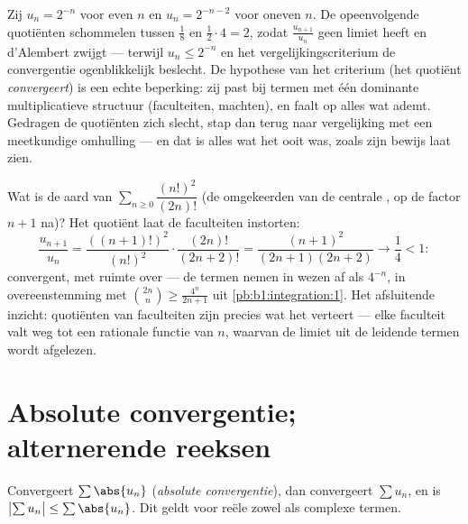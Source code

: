 \begin{example}\label{ex:b1:series:rationotnecessary}
Zij $u_n = 2^{-n}$ voor even $n$ en $u_n = 2^{-n-2}$ voor oneven
$n$. De opeenvolgende quotiënten schommelen tussen $\frac{1}{8}$
en $\frac12\cdot4 = 2$, zodat $\frac{u_{n+1}}{u_n}$ geen limiet
heeft en d'Alembert zwijgt --- terwijl $u_n \leq 2^{-n}$ en het
vergelijkingscriterium de convergentie ogenblikkelijk beslecht.
De hypothese van het criterium (het quotiënt \emph{convergeert})
is een echte beperking: zij past bij termen met één dominante
multiplicatieve structuur (faculteiten, machten), en faalt op
alles wat ademt. Gedragen de quotiënten zich slecht, stap dan
terug naar vergelijking met een meetkundige omhulling --- en dat
is alles wat het  ooit was, zoals zijn bewijs
laat zien.
\end{example}

\begin{example}\label{ex:b1:series:ratiobinom}
Wat is de aard van $\sum_{n\geq0} \dfrac{(n!)^2}{(2n)!}$ (de
omgekeerden van de centrale , op de factor
$n + 1$ na)? Het quotiënt laat de faculteiten instorten:
\[
\frac{u_{n+1}}{u_n}
= \frac{((n+1)!)^2}{(n!)^2}\cdot\frac{(2n)!}{(2n+2)!}
= \frac{(n+1)^2}{(2n+1)(2n+2)}
\longrightarrow \frac14 < 1 :
\]
convergent, met ruimte over --- de termen nemen in wezen af als
$4^{-n}$, in overeenstemming met $\binom{2n}{n} \geq
\frac{4^n}{2n+1}$ uit \cref{pb:b1:integration:1}. Het
afsluitende inzicht: quotiënten van faculteiten zijn precies wat
het  verteert --- elke faculteit valt weg tot
een rationale functie van $n$, waarvan de limiet uit de leidende
termen wordt afgelezen.
\end{example}

\section{Absolute convergentie; alternerende reeksen}

\begin{theorem}\label{thm:b1:series:absolute}
Convergeert $\sum \abs{u_n}$ (\emph{absolute
convergentie}), dan convergeert $\sum
u_n$, en is $\bigl|\sum u_n\bigr| \leq \sum \abs{u_n}$. Dit geldt
voor reële zowel als complexe termen.
\end{theorem}

